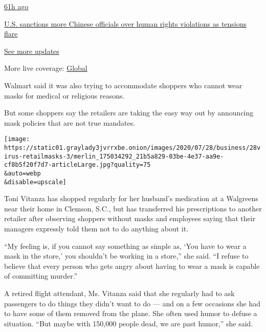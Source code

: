 \href{https://www.nytimes3xbfgragh.onion/live/2020/07/31/business/stock-market-today-coronavirus?action=click\&pgtype=Article\&state=default\&region=MAIN_CONTENT_1\&context=storylines_live_updates\#us-sanctions-more-chinese-officials-over-human-rights-violations-as-tensions-flare}{61h
ago}

\href{https://www.nytimes3xbfgragh.onion/live/2020/07/31/business/stock-market-today-coronavirus?action=click\&pgtype=Article\&state=default\&region=MAIN_CONTENT_1\&context=storylines_live_updates\#us-sanctions-more-chinese-officials-over-human-rights-violations-as-tensions-flare}{U.S.
sanctions more Chinese officials over human rights violations as
tensions flare}

\href{https://www.nytimes3xbfgragh.onion/live/2020/07/31/business/stock-market-today-coronavirus?action=click\&pgtype=Article\&state=default\&region=MAIN_CONTENT_1\&context=storylines_live_updates}{See
more updates}

More live coverage:
\href{https://www.nytimes3xbfgragh.onion/2020/08/01/world/coronavirus-covid-19.html?action=click\&pgtype=Article\&state=default\&region=MAIN_CONTENT_1\&context=storylines_live_updates}{Global}

Walmart said it was also trying to accommodate shoppers who cannot wear
masks for medical or religious reasons.

But some shoppers say the retailers are taking the easy way out by
announcing mask policies that are not true mandates.

\texttt{[image: https://static01.graylady3jvrrxbe.onion/images/2020/07/28/business/28virus-retailmasks-3/merlin\_175034292\_21b5a829-03be-4e37-aa9e-cf8b5f20f7d7-articleLarge.jpg?quality=75\\\&auto=webp\\\&disable=upscale]}

Toni Vitanza has shopped regularly for her husband's medication at a
Walgreens near their home in Clemson, S.C., but has transferred his
prescriptions to another retailer after observing shoppers without masks
and employees saying that their managers expressly told them not to do
anything about it.

``My feeling is, if you cannot say something as simple as, `You have to
wear a mask in the store,' you shouldn't be working in a store,'' she
said. ``I refuse to believe that every person who gets angry about
having to wear a mask is capable of committing murder.''

A retired flight attendant, Ms. Vitanza said that she regularly had to
ask passengers to do things they didn't want to do --- and on a few
occasions she had to have some of them removed from the plane. She often
used humor to defuse a situation. ``But maybe with 150,000 people dead,
we are past humor,'' she said.


